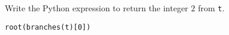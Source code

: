 \begin{blocksection}
\question Write the Python expression to return the integer \lstinlin$2$ from \lstinline$t$.

\begin{solution}[1em]
\begin{lstlisting}
root(branches(t)[0])
\end{lstlisting}
\end{solution}
\end{blocksection}
